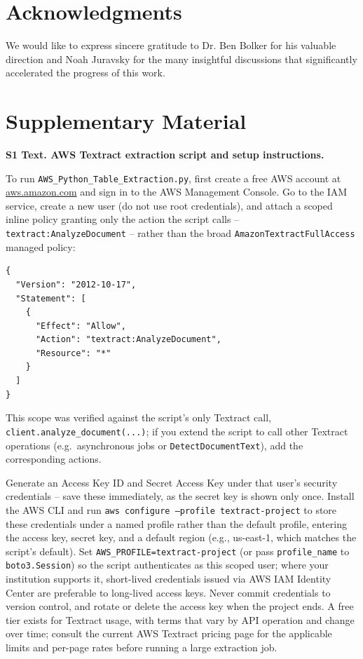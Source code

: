 \documentclass[12pt]{article}
\begin{document}
\section*{Acknowledgments}
We would like to express sincere gratitude to Dr. Ben Bolker for his valuable direction and Noah Juravsky for the many insightful discussions that significantly accelerated the progress of this work. 
\clearpage
\printbibliography 

\clearpage
\section*{Supplementary Material}
\label{sec:supp}

\textbf{S1 Text. AWS Textract extraction script and setup instructions.}

To run \texttt{AWS\_Python\_Table\_Extraction.py}, first create a free AWS account at \href{https://aws.amazon.com/}{aws.amazon.com} and sign in to the AWS Management Console. Go to the IAM service, create a new user (do not use root credentials), and attach a scoped inline policy granting only the action the script calls -- \texttt{textract:AnalyzeDocument} -- rather than the broad \texttt{AmazonTextractFullAccess} managed policy:

\begin{lstlisting}[basicstyle=\ttfamily\footnotesize]
{
  "Version": "2012-10-17",
  "Statement": [
    {
      "Effect": "Allow",
      "Action": "textract:AnalyzeDocument",
      "Resource": "*"
    }
  ]
}
\end{lstlisting}

\noindent This scope was verified against the script's only Textract call, \texttt{client.analyze\_document(...)}; if you extend the script to call other Textract operations (e.g.\ asynchronous jobs or \texttt{DetectDocumentText}), add the corresponding actions.

Generate an Access Key ID and Secret Access Key under that user's security credentials -- save these immediately, as the secret key is shown only once. Install the AWS CLI and run \texttt{aws configure --profile textract-project} to store these credentials under a named profile rather than the default profile, entering the access key, secret key, and a default region (e.g., us-east-1, which matches the script's default). Set \texttt{AWS\_PROFILE=textract-project} (or pass \texttt{profile\_name} to \texttt{boto3.Session}) so the script authenticates as this scoped user; where your institution supports it, short-lived credentials issued via AWS IAM Identity Center are preferable to long-lived access keys. Never commit credentials to version control, and rotate or delete the access key when the project ends. A free tier exists for Textract usage, with terms that vary by API operation and change over time; consult the current AWS Textract pricing page for the applicable limits and per-page rates before running a large extraction job.
\end{document}
